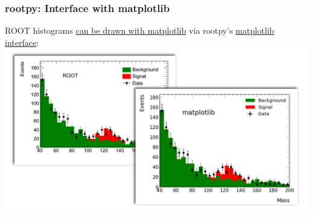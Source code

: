 \documentclass[10pt,professionalfonts,serif,usenames,dvipsnames,svgnames,table]{beamer}
\begin{document}
\begin{frame}
    \frametitle{rootpy: Interface with matplotlib}
    ROOT histograms
    \href{https://github.com/rootpy/rootpy/blob/master/examples/plotting/plot_matplotlib_hist.py}{
    can be drawn with matplotlib} via rootpy's
    \href{https://github.com/rootpy/rootpy/blob/master/rootpy/plotting/root2matplotlib.py}{
    matplotlib interface}:
    \includegraphics[width=\textwidth]{figs/examples/matplotlib_example.png}
\end{frame}
\end{document}
